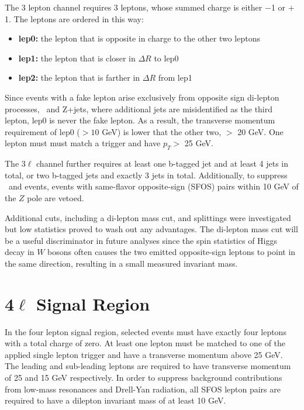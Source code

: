 The 3 lepton channel requires 3 leptons, whose summed charge is either
$-$1 or $+$1. The leptons are ordered in this way:

\begin{itemize}
\item \textbf{lep0:} the lepton that is opposite in charge to the other two leptons
\item \textbf{lep1:} the lepton that is closer in $\Delta R$ to lep0
\item \textbf{lep2:} the lepton that is farther in $\Delta R$ from lep1
\end{itemize}

Since events with a fake lepton arise exclusively from opposite sign di-lepton processes, \ttbar\ and Z+jets, where additional jets are 
misidentified as the third lepton, lep0 is never the fake lepton. As a result, the transverse momentum 
requirement of lep0 ($> 10$ GeV) is lower that the other two, $>$ 20 GeV.  One lepton must
must match a trigger and have $p_T >$ 25 GeV. 

The 3$\ell$ channel further requires at least one b-tagged jet and at least 4 jets in total, or two b-tagged jets and exactly 3 jets in 
total. Additionally, to suppress \WZ\ and \zj events, events with same-flavor opposite-sign (SFOS) pairs
within 10 GeV of the $Z$ pole are vetoed.

Additional cuts, including a di-lepton mass cut, and splittings were investigated but low statistics proved to wash out any advantages.
The di-lepton mass cut will be a useful discriminator in future analyses since the spin statistics of Higgs decay in $W$ bosons often
causes the two emitted opposite-sign leptons to point in the same direction, resulting in a small measured invariant mass. 

\section{4$\ell$ Signal Region}

In the four lepton signal region, selected events must have exactly four leptons with a total charge of zero. 
At least one lepton must be matched to one of the applied single lepton trigger and have a transverse momentum above 25 GeV. 
The leading and sub-leading leptons are required to have transverse momentum of 25 and 15 GeV respectively. 
In order to suppress background contributions from low-mass resonances and Drell-Yan radiation, all SFOS lepton pairs are required to have a dilepton invariant mass of at least 10 GeV. 

